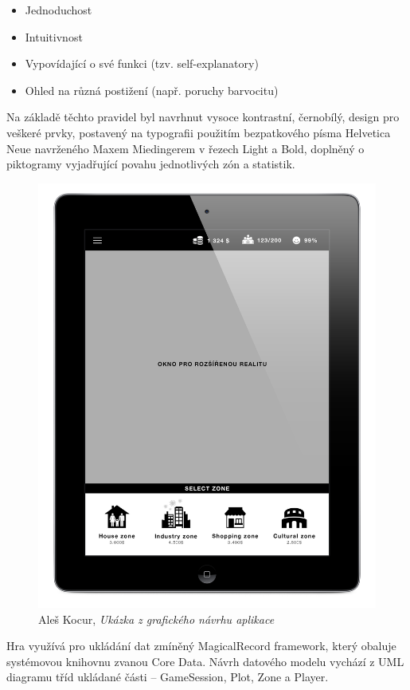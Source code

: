 \documentclass[twoside,12pt]{article}
\begin{document}
\begin{itemize}
\item Jednoduchost
\item Intuitivnost
\item Vypovídající o své funkci (tzv. self-explanatory)
\item Ohled na různá postižení (např. poruchy barvocitu) 
\end{itemize}

Na základě těchto pravidel byl navrhnut vysoce kontrastní, černobílý, design pro veškeré prvky, postavený na typografii použitím bezpatkového písma Helvetica Neue navrženého Maxem Miedingerem v řezech Light a Bold, doplněný o piktogramy vyjadřující povahu jednotlivých zón a statistik.  
 
 \begin{figure}[H]
\centering
    \includegraphics[width=430px, center]{images/ipad-layout.jpg}
\captionsetup{justification=centering}
    \caption{Aleš Kocur, \textit{Ukázka z grafického návrhu aplikace}}
    \label{class_diagram}
\end{figure}
 
 
 Hra využívá pro ukládání dat zmíněný MagicalRecord framework, který obaluje systémovou knihovnu zvanou Core Data. Návrh datového modelu vychází z UML diagramu tříd ukládané části -- GameSession, Plot, Zone a Player.
 
\end{document}
